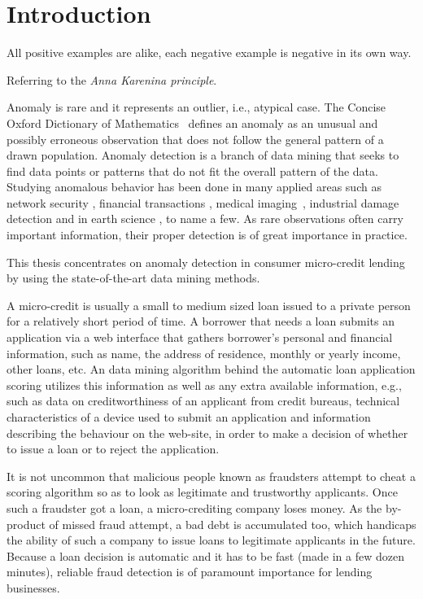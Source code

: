 
\chapter{Introduction}
\epigraph{All positive examples are
alike, each negative example
is negative in its own way.}{Referring to the \textit{Anna Karenina principle}.}
\label{intro}

Anomaly is rare and it represents an outlier, i.e., atypical case. The Concise Oxford Dictionary of Mathematics~\cite{Clapham:2013} defines an anomaly as an unusual and possibly erroneous observation that does not follow the general pattern of a drawn population. Anomaly detection is a branch of data mining that seeks to find data points or patterns that do not fit the overall pattern of the data. Studying anomalous behavior has been done in many applied areas such as network security \cite{Peddabachigari:2007}, financial transactions \cite{Eskin:2010,Ahmed:2015}, medical imaging~\cite{Spence:2001:DSC:882464.882797}, industrial damage detection \cite{Hollier:Austin:2002} and in earth science \cite{Das:2009:ADS:1601966.1601989}, to name a few. As rare observations often carry important information, their proper detection is of great importance in practice. 

This thesis concentrates on anomaly detection in consumer micro-credit lending by using the state-of-the-art data mining methods. 

A micro-credit is usually a small to medium sized loan issued to a private person for a relatively short period of time. A borrower that needs a loan submits an application via a web interface that gathers borrower's personal and financial information, such as name, the address of residence, monthly or yearly income, other loans, etc. An data mining algorithm behind the automatic loan application scoring utilizes this information as well as any extra available information, e.g., such as data on creditworthiness of an applicant from credit bureaus, technical characteristics of a device used to submit an application and information describing the behaviour on the web-site, in order to make a decision of whether to issue a loan or to reject the application. 

It is not uncommon that malicious people known as fraudsters attempt to cheat a scoring algorithm so as to look as legitimate and trustworthy applicants. Once such a fraudster got a loan, a  micro-crediting company loses money. As the by-product of missed fraud attempt, a bad debt is accumulated too, which handicaps the ability of such a company to issue loans to legitimate applicants in the future. Because a loan decision is automatic and it has to be fast (made in a few dozen minutes), reliable fraud detection is of paramount importance for lending businesses. 

